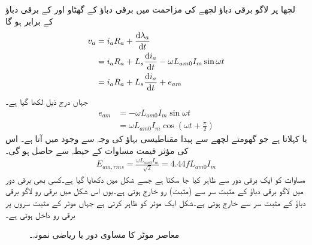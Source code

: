 لچھا  پر لاگو برقی دباؤ لچھے کی مزاحمت  میں برقی دباؤ کے گھٹاو اور  کے برقی دباؤ کے برابر ہو گا
\begin{gather}
\begin{aligned}\label{مساوات_معاصر_دباو_مساوی_مزاحمت_گھتاو_اور_پیدا_دباو}
v_a&=i_a R_a+\frac{\dif \lambda_a}{\dif t}\\
&=i_a R_a+L_s \frac{\dif i_a}{\dif t}-\omega L_{am0} I_m \sin \omega t\\
&=i_a R_a+L_s \frac{\dif i_a}{\dif t}+e_{am}
\end{aligned}
\end{gather}
جہاں درج ذیل لکھا گیا  ہے۔
\begin{align}\label{مساوات_معاصر_امالی_دباو}
e_{am}&=-\omega L_{am0} I_m \sin \omega t\nonumber\\
&=\omega L_{am0} I_m \cos \left (\omega t+\frac{\pi}{2} \right)
\end{align}
 یا  کہلاتا ہے جو گھومتے لچھے سے پیدا مقناطیسی بہاؤ کی وجہ سے وجود میں آتا ہے۔  اس کی مؤثر قیمت  مساوات  کے حیطہ    سے حاصل ہو گی۔
\begin{align}\label{مساوات_معاصر_موثر_پیدا_دباو}
E_{am,rms}=\frac{\omega L_{am0} I_m}{\sqrt{2}}=4.44 f L_{am0} I_m
\end{align}
مساوات   کو ایک برقی دور سے ظاہر کیا جا سکتا ہے جسے شکل   میں دکھایا گیا ہے۔کسی بھی برقی دور میں لاگو برقی دباؤ کے  مثبت سر سے (مثبت) رو خارج ہوتی ہے۔یوں اس شکل میں برقی رو  لاگو برقی دباؤ  کے مثبت سر سے خارج ہوتی ہے۔شکل  ایک موٹر کو ظاہر کرتی ہے جہاں موٹر کے مثبت سروں پر برقی رو داخل ہوتی  ہے۔
\begin{figure}
\centering
\caption{معاصر موٹر کا مساوی دور یا ریاضی نمونہ۔}
\label{شکل_معاصر_موٹر_کا_مساوی_دور}
\end{figure}
